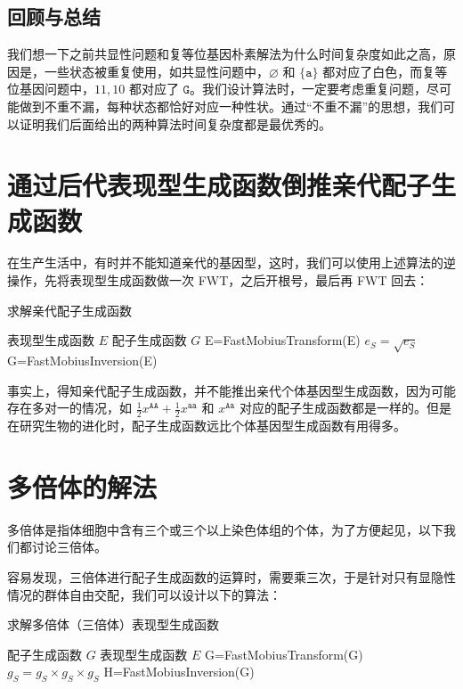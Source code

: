 \documentclass[12pt]{article} %
\begin{document}
\subsection{回顾与总结}

我们想一下之前共显性问题和复等位基因朴素解法为什么时间复杂度如此之高，原因是，一些状态被重复使用，如共显性问题中，$\varnothing$ 和 $\{\texttt{a}\}$ 都对应了白色，而复等位基因问题中，$11,10$ 都对应了 $\texttt{G}$。我们设计算法时，一定要考虑重复问题，尽可能做到不重不漏，每种状态都恰好对应一种性状。通过“不重不漏”的思想，我们可以证明我们后面给出的两种算法时间复杂度都是最优秀的。

\newpage

\section{通过后代表现型生成函数倒推亲代配子生成函数}

在生产生活中，有时并不能知道亲代的基因型，这时，我们可以使用上述算法的逆操作，先将表现型生成函数做一次 FWT，之后开根号，最后再 FWT 回去：

\begin{algorithm}
	\caption{求解亲代配子生成函数}
	\begin{algorithmic}[1]
		\Require 表现型生成函数 $E$
		\Ensure 配子生成函数 $G$
		\State E=FastMobiusTransform(E)
		\State $e_S=\sqrt{e_S}$
		\EndFor
		\State G=FastMobiusInversion(E)
		\State {}
		\EndFunction
	\end{algorithmic}
\end{algorithm}

事实上，得知亲代配子生成函数，并不能推出亲代个体基因型生成函数，因为可能存在多对一的情况，如 $\frac{1}{2}x^{\texttt{AA}}+\frac{1}{2}x^{\texttt{aa}}$ 和 $x^{\texttt{Aa}}$ 对应的配子生成函数都是一样的。但是在研究生物的进化时，配子生成函数远比个体基因型生成函数有用得多。

\section{多倍体的解法}

多倍体是指体细胞中含有三个或三个以上染色体组的个体，为了方便起见，以下我们都讨论三倍体。

容易发现，三倍体进行配子生成函数的运算时，需要乘三次，于是针对只有显隐性情况的群体自由交配，我们可以设计以下的算法：

\begin{algorithm}
	\caption{求解多倍体（三倍体）表现型生成函数}
	\begin{algorithmic}[1]
		\Require 配子生成函数 $G$
		\Ensure 表现型生成函数 $E$
		\State G=FastMobiusTransform(G)
		\State $g_S=g_S \times g_S \times g_S$
		\EndFor
		\State H=FastMobiusInversion(G)
		\State {}
		\EndFunction
	\end{algorithmic}
\end{algorithm}
\end{document}
